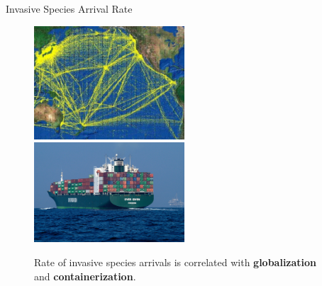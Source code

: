 \documentclass[]{beamer}
\begin{document}
\begin{frame}{Invasive Species Arrival Rate}
	\begin{figure}
		\includegraphics[width=0.5\textwidth]{pacific-traffic.png}
		\includegraphics[width=0.5\textwidth]{container-ship.jpg}
		\caption{Rate of invasive species arrivals is correlated with \textbf{globalization} and \textbf{containerization}.}
	\end{figure}
\end{frame}
\end{document}
